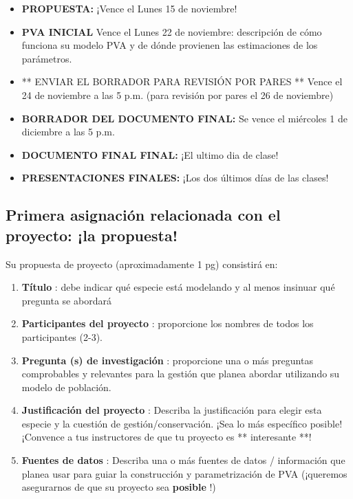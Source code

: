 \documentclass[
]{article}
\providecommand{\tightlist}{%
  \setlength{\itemsep}{0pt}\setlength{\parskip}{0pt}}
\begin{document}
\begin{itemize}
\tightlist
\item
  \textbf{PROPUESTA: } ¡Vence el Lunes 15 de noviembre!
\item
  \textbf{PVA INICIAL } Vence el Lunes 22 de noviembre: descripción de
  cómo funciona su modelo PVA y de dónde provienen las estimaciones de
  los parámetros.
\item
  ** ENVIAR EL BORRADOR PARA REVISIÓN POR PARES ** Vence el 24 de
  noviembre a las 5 p.m. (para revisión por pares el 26 de noviembre)
\item
  \textbf{BORRADOR DEL DOCUMENTO FINAL: } Se vence el miércoles 1 de
  diciembre a las 5 p.m.
\item
  \textbf{DOCUMENTO FINAL FINAL: } ¡El ultimo dia de clase!
\item
  \textbf{PRESENTACIONES FINALES: } ¡Los dos últimos días de las clases!
\end{itemize}

\hypertarget{primera-asignaciuxf3n-relacionada-con-el-proyecto-la-propuesta}{%
\subsection{Primera asignación relacionada con el proyecto: ¡la
propuesta!}\label{primera-asignaciuxf3n-relacionada-con-el-proyecto-la-propuesta}}

Su propuesta de proyecto (aproximadamente 1 pg) consistirá en:

\begin{enumerate}
\def\labelenumi{\arabic{enumi}.}
\tightlist
\item
  \textbf{Título }: debe indicar qué especie está modelando y al menos
  insinuar qué pregunta se abordará
\item
  \textbf{Participantes del proyecto }: proporcione los nombres de todos
  los participantes (2-3).
\item
  \textbf{Pregunta (s) de investigación }: proporcione una o más
  preguntas comprobables y relevantes para la gestión que planea abordar
  utilizando su modelo de población.
\item
  \textbf{Justificación del proyecto }: Describa la justificación para
  elegir esta especie y la cuestión de gestión/conservación. ¡Sea lo más
  específico posible! ¡Convence a tus instructores de que tu proyecto es
  ** interesante **!
\item
  \textbf{Fuentes de datos }: Describa una o más fuentes de datos /
  información que planea usar para guiar la construcción y
  parametrización de PVA (¡queremos asegurarnos de que su proyecto sea
  \textbf{posible }!)
\end{enumerate}
\end{document}

